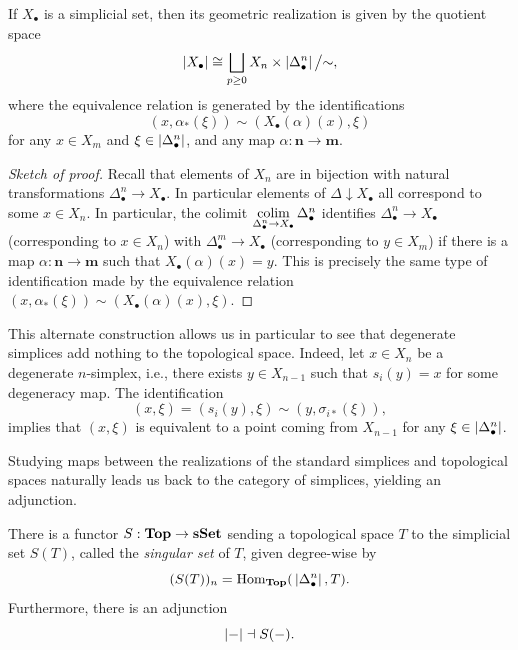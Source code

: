 \begin{proposition}
    If $X_\bullet$ is a simplicial set, then its geometric realization is given by the quotient space
    \[ \abs{X_\bullet} \cong \bigsqcup_{p \geq 0} X_n \times \abs{\Delta^n_{\bullet}} \big/ {\sim},\]
    where the equivalence relation is generated by the identifications 
    \[(x, \alpha_{*}(\xi)) \sim (X_{\bullet}(\alpha)(x), \xi) \]
    for any $x \in X_m$ and $\xi \in \abs{\Delta^n_{\bullet}}$, and any map $\alpha : \textbf{n} \to \textbf{m}$.
\end{proposition}

\begin{proof}[Sketch of proof]
    Recall that elements of $X_n$ are in bijection with natural transformations $\Delta^n_{\bullet} \to X_{\bullet}$. In particular elements of $\Delta \downarrow X_{\bullet}$ all correspond to some $x \in X_n$. In particular, the colimit $\colim_{\Delta^n_{\bullet} \to X_{\bullet}} \Delta^n_{\bullet}$ identifies $\Delta^n_{\bullet} \to X_{\bullet}$ (corresponding to $x \in X_n$) with $\Delta^m_{\bullet} \to X_{\bullet}$ (corresponding to $y \in X_m$) if there is a map $\alpha : \textbf{n} \to \textbf{m}$ such that $X_{\bullet}(\alpha)(x) = y$. This is precisely the same type of identification made by the equivalence relation $(x, \alpha_{*}(\xi)) \sim (X_{\bullet}(\alpha)(x), \xi)$.
\end{proof}

\begin{remark}
    This alternate construction allows us in particular to see that degenerate simplices add nothing to the topological space. Indeed, let $x \in X_n$ be a degenerate $n$-simplex, i.e., there exists $y \in X_{n-1}$ such that $s_i(y) = x$ for some degeneracy map. The identification
    \[ (x, \xi) = (s_i (y), \xi) \sim (y, \sigma_{i *}(\xi)),\]
    implies that $(x, \xi)$ is equivalent to a point coming from $X_{n-1}$ for any $\xi \in \abs{\Delta^n_{\bullet}}$.
\end{remark}

Studying maps between the realizations of the standard simplices and topological spaces naturally leads us back to the category of simplices, yielding an adjunction.

\begin{propdef}
    There is a functor $S : \Top \to \sSet$ sending a topological space $T$ to the simplicial set $S(T)$, called the \emph{singular set} of $T$, given degree-wise by
    \[ (S(T))_n = \Hom[\Top]{\abs{\Delta^n_{\bullet}}}{T}. \]
    Furthermore, there is an adjunction
    \[ \abs{ - } \dashv S(-). \]
\end{propdef}

